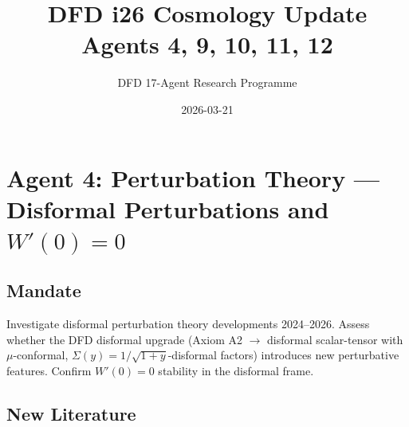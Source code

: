 \documentclass[11pt,a4paper]{article}
\title{DFD i26 Cosmology Update\\Agents 4, 9, 10, 11, 12}
\author{DFD 17-Agent Research Programme}
\date{2026-03-21}
\begin{document}
\maketitle
\tableofcontents
\newpage

\section{Agent 4: Perturbation Theory --- Disformal Perturbations and $W'(0)=0$}

\subsection{Mandate}
Investigate disformal perturbation theory developments 2024--2026. Assess whether the DFD disformal upgrade (Axiom A2 $\to$ disformal scalar-tensor with $\mu$-conformal, $\Sigma(y)=1/\sqrt{1+y}$-disformal factors) introduces new perturbative features. Confirm $W'(0)=0$ stability in the disformal frame.

\subsection{New Literature}
\end{document}
